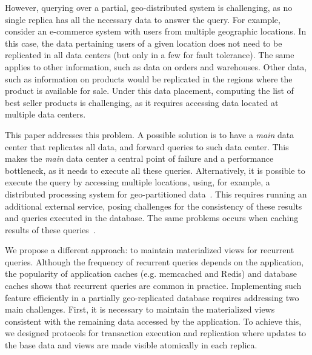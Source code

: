 \documentclass[sigplan,twocolumn,review,anonymous]{acmart}
\begin{document}
However, querying over a partial, geo-distributed system is challenging, as no single replica has all the necessary data to answer the query. %
For example, consider an e-commerce system with users from multiple geographic locations.
In this case, the data pertaining users of a given location does not need to be replicated in all data centers
(but only in a few for fault tolerance). The same applies to other information, such as data on orders and 
warehouses.
Other data, such as information on products would be replicated in the regions where the product
is available for sale.  
Under this data placement, computing the list of best seller products is challenging, as it requires
accessing data located at multiple data centers.

This paper addresses this problem. %
A possible solution is to
have a \emph{main} data center that replicates all data, and forward queries to such data center.
This makes the \emph{main} data center a central point of failure and a performance bottleneck, as it needs to execute all these queries.
Alternatively, 
it is possible to execute the query by accessing multiple locations, using, for example, 
a distributed processing system for geo-partitioned data~\cite{kloudas2015pixida,jetstream}.
This requires running an additional external service, posing challenges for the consistency of these results and 
queries executed in the database.
The same problems occurs when caching results of these queries~\cite{chronocache}.

We propose a different approach: to maintain materialized views for recurrent queries.
Although the frequency of recurrent
queries depends on the application, the popularity of application caches (e.g. memcached and Redis)  
and database caches \cite{chronocache} shows that recurrent queries are common in practice.
Implementing such feature efficiently in a partially geo-replicated database requires 
addressing two main challenges. 
First, it is necessary to maintain the materialized views consistent with the remaining data
accessed by the application. 
To achieve this, we designed protocols for transaction execution and replication where updates 
to the base data and views are made visible atomically in each replica.
\end{document}
